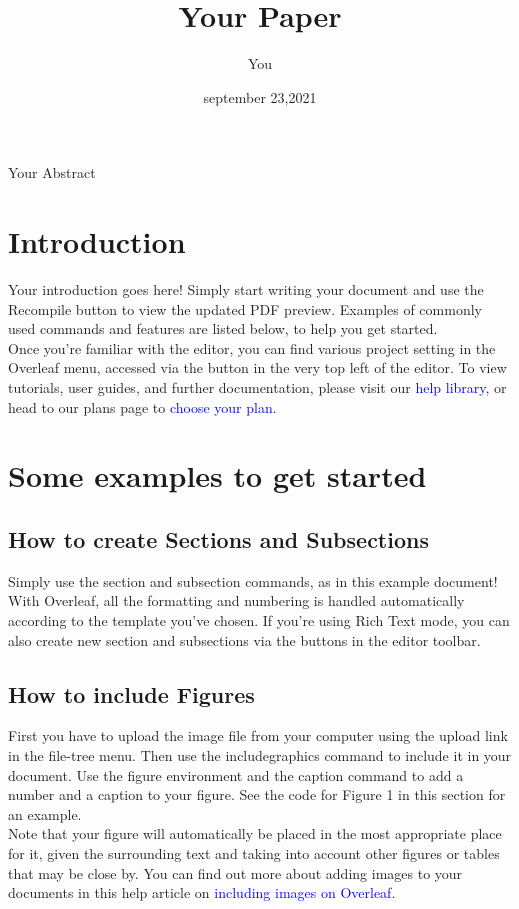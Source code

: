 \documentclass{article}
\title{Your Paper}
\author{You}
\date{september 23,2021}
\begin{document}
	\maketitle
	\begin{abstract}
		\end{abstract}
	 \hspace{1 cm} Your Abstract
	  \section{Introduction}
	  Your introduction goes here! Simply start writing your document and use the Recompile button to
	  view the updated PDF preview. Examples of commonly used commands and features are listed below,
	  to help you get started.\\
	 Once you’re familiar with the editor, you can find various project setting in the Overleaf menu,
	  accessed via the button in the very top left of the editor. To view tutorials, user guides, and further
	  documentation, please visit our 
	  \textcolor {blue}{help library,} or head to our plans page to
	   \textcolor{blue}{choose your plan.}
	   \section{Some examples to get started}
	   \subsection{How to create Sections and Subsections}
	   Simply use the section and subsection commands, as in this example document! With Overleaf, all
	   the formatting and numbering is handled automatically according to the template you’ve chosen. If
	   you’re using Rich Text mode, you can also create new section and subsections via the buttons in the
	   editor toolbar. 
	   \subsection{How to include Figures}
	   First you have to upload the image file from your computer using the upload link in the file-tree menu.
	   Then use the includegraphics command to include it in your document. Use the figure environment
	   and the caption command to add a number and a caption to your figure. See the code for Figure 1 in
	   this section for an example.\\
	   
	   \hspace{1 cm}Note that your figure will automatically be placed in the most appropriate place for it, given the
	   surrounding text and taking into account other figures or tables that may be close by. You can find
	   out more about adding images to your documents in this help article on 
	   \textcolor{blue}{including images on Overleaf.}
	   \newpage
\end{document}
